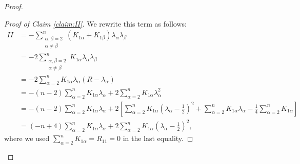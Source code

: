 \documentclass[10pt,a4paper]{amsart}
\begin{document}
\begin{proof}
	\begin{proof}[Proof of Claim \ref{claim:II}]
		We rewrite this term as follows:
		\begin{align*}
			II &= -\sum_{\substack{\alpha,\beta=2 \\ \alpha\neq\beta}}^n (K_{1\alpha} + K_{1\beta})\lambda_\alpha\lambda_\beta \\
			&= -2\sum_{\substack{\alpha,\beta=2 \\ \alpha\neq\beta}}^n K_{1\alpha}\lambda_\alpha\lambda_\beta \\
			&= -2\sum_{\alpha=2}^n K_{1\alpha}\lambda_\alpha(R - \lambda_\alpha) \\
			&= -(n-2)\sum_{\alpha=2}^n K_{1\alpha}\lambda_\alpha + 2\sum_{\alpha=2}^n K_{1\alpha}\lambda_\alpha^2 \\
			&= -(n-2)\sum_{\alpha=2}^n K_{1\alpha}\lambda_\alpha + 2\left[\sum_{\alpha=2}^n K_{1\alpha}\left(\lambda_\alpha - \frac{1}{2}\right)^2 + \sum_{\alpha=2}^n K_{1\alpha}\lambda_\alpha - \frac{1}{4}\sum_{\alpha=2}^n K_{1\alpha}\right] \\
			&= (-n+4)\sum_{\alpha=2}^n K_{1\alpha}\lambda_\alpha + 2\sum_{\alpha=2}^n K_{1\alpha}\left(\lambda_\alpha - \frac{1}{2}\right)^2,
		\end{align*}
		where we used $\sum_{\alpha=2}^n K_{1\alpha} = R_{11} = 0$ in the last equality.
		

\end{proof}
\end{proof}
\end{document}
